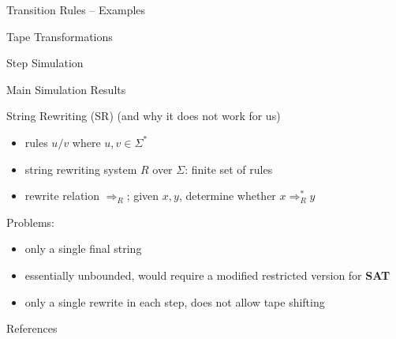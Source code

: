 \documentclass[11pt,usenames,dvipsnames,
hyperref={pdfencoding=auto,psdextra}]{beamer}
\newcommand*{\sat}{\textbf{SAT}}
\begin{document}
\begin{frame}{Transition Rules -- Examples}

\end{frame}

\begin{frame}{Tape Transformations}
  
\end{frame}

\begin{frame}{Step Simulation}
\end{frame}

\begin{frame}{Main Simulation Results}

\end{frame}

\begin{frame}{String Rewriting (SR) (and why it does not work for us)}
  \begin{itemize}
    \item rules $u/v$ where $u, v \in \Sigma^*$
    \item string rewriting system $R$ over $\Sigma$: finite set of rules
    \item rewrite relation $\Rightarrow_R$; given $x, y$, determine whether $x \Rightarrow_R^* y$ 
  \end{itemize}

  Problems: 
  \begin{itemize}
    \item only a single final string 
    \item essentially unbounded, would require a modified restricted version for \sat{}
    \item only a single rewrite in each step, does not allow tape shifting
  \end{itemize}
\end{frame}

\begin{frame}[allowframebreaks]{References}
  \nocite{Sipser:TheoryofComputation}
  \nocite{Bläser:TISkript}
  
  {}
\end{frame}
\end{document}
